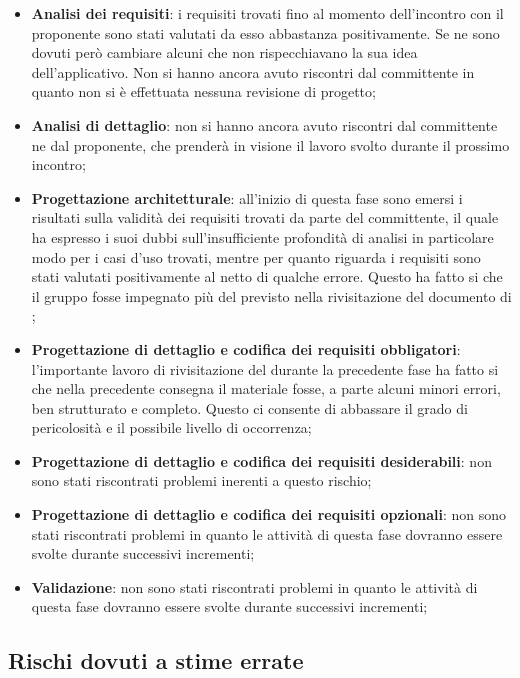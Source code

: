 		\begin{itemize}
			\item \textbf{Analisi dei requisiti}: i requisiti trovati fino al momento dell'incontro con il proponente sono stati valutati da esso abbastanza positivamente. Se ne sono dovuti però cambiare alcuni che non rispecchiavano la sua idea dell'applicativo.  \newline
			Non si hanno ancora avuto riscontri dal committente in quanto non si è effettuata nessuna revisione di progetto;
			\item \textbf{Analisi di dettaglio}: non si hanno ancora avuto riscontri dal committente ne dal proponente, che prenderà in visione il lavoro svolto durante il prossimo incontro;
			\item \textbf{Progettazione architetturale}: all'inizio di questa fase sono emersi i risultati sulla validità dei requisiti trovati da parte del committente, il quale ha espresso i suoi dubbi sull'insufficiente profondità di analisi in particolare modo per i casi d'uso trovati, mentre per quanto riguarda i requisiti sono stati valutati positivamente al netto di qualche errore. Questo ha fatto si che il gruppo fosse impegnato più del previsto nella rivisitazione del documento di \docNameVersionAdR;
			\item \textbf{Progettazione di dettaglio e codifica dei requisiti obbligatori}: l'importante lavoro di rivisitazione del \docNameVersionAdR{} durante la precedente fase ha fatto si che nella precedente consegna il materiale fosse, a parte alcuni minori errori, ben strutturato e completo. Questo ci consente di abbassare il grado di pericolosità e il possibile livello di occorrenza;
			\item \textbf{Progettazione di dettaglio e codifica dei requisiti desiderabili}: non sono stati riscontrati problemi inerenti a questo rischio;
			\item \textbf{Progettazione di dettaglio e codifica dei requisiti opzionali}: non sono stati riscontrati problemi in quanto le attività di questa fase dovranno essere svolte durante successivi incrementi;
			\item \textbf{Validazione}: non sono stati riscontrati problemi in quanto le attività di questa fase dovranno essere svolte durante successivi incrementi;
		\end{itemize}


	\subsection{Rischi dovuti a stime errate} %
	\label{sub:rischi_dovuti_a_stime_errate}
